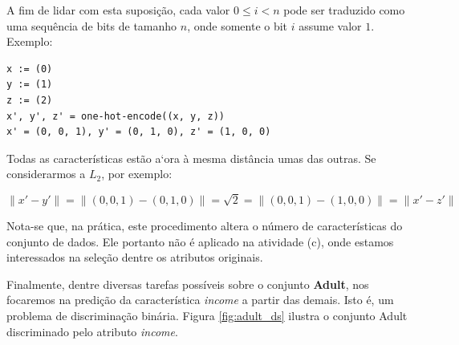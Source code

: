 \documentclass[12pt]{report}
\begin{document}
\begin{itemize}
	A fim de lidar com esta suposição, cada valor $0 \le i < n$ pode ser traduzido como uma sequência de bits de tamanho $n$, onde somente o bit $i$ assume valor $1$. Exemplo:
	
	\begin{lstlisting}[label={lst:label}]
x := (0)
y := (1)
z := (2)
x', y', z' = one-hot-encode((x, y, z))
x' = (0, 0, 1), y' = (0, 1, 0), z' = (1, 0, 0)
	\end{lstlisting}
	
	Todas as características estão a`ora à mesma distância umas das outras. Se considerarmos a $L_2$, por exemplo:
	
	$$\|x' - y'\| = \|(0, 0, 1) - (0, 1, 0)\| = \sqrt{2} = \|(0, 0, 1) - (1, 0, 0)\| = \|x' - z'\|$$
	
	Nota-se que, na prática, este procedimento altera o número de características do conjunto de dados. Ele portanto não é aplicado na atividade (c), onde estamos interessados na seleção dentre os atributos originais.
\end{itemize}
		
Finalmente, dentre diversas tarefas possíveis sobre o conjunto \textbf{Adult}, nos focaremos na predição da característica \textit{income} a partir das demais. Isto é, um problema de discriminação binária. Figura \ref{fig:adult_ds} ilustra o conjunto Adult discriminado pelo atributo \textit{income}.
				
\end{document}
